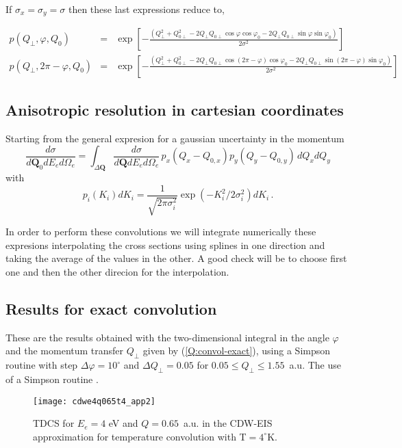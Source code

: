 If $\sigma_{x} = \sigma_{y}=\sigma $ then these last expressions reduce to,

\begin{eqnarray*}
p(Q_{\perp },\varphi ,Q_{0}) &=&\exp \left[ -\frac{(Q_{\perp }^{2}+Q_{0\perp}^{2}-2Q_{\perp} Q_{0\perp }\cos \varphi \cos \varphi _{0}-2Q_{\perp} Q_{0\perp }\sin \varphi \sin \varphi _{0})}{2\sigma ^{2}}\right]  \\
p(Q_{\perp },2\pi -\varphi ,Q_{0}) &=&\exp \left[ -\frac{(Q_{\perp}^{2}+Q_{0\perp }^{2}-2Q_{\perp }Q_{0\perp }\cos \left( 2\pi -\varphi \right) \cos \varphi _{0}-2Q_{\perp }Q_{0\perp }\sin \left( 2\pi -\varphi \right) \sin \varphi _{0})}{2\sigma ^{2}}\right] 
\end{eqnarray*}


\subsection{Anisotropic resolution in cartesian coordinates} 
\label{S:anis-resol-carte-coord}

Starting from the general expresion for a gaussian uncertainty in the momentum
\[
\frac{d \sigma}{d \bm{Q}_{0} d E_{e} d \Omega_{e}} = \int_{\Delta
  \bm{Q}} \frac{d \sigma}{d \bm{Q} d E_{e} d \Omega_{e}}\, p_{x}( Q_{x}- Q_{0,x} ) p_{y}( Q_{y}- Q_{0,y} ) \, d Q_{x} d Q_{y}
\]
with
\[
 p_{i}(K_{i}) dK_{i} = \frac{1}{\sqrt{2 \pi \sigma_{i}^2}} \exp (-K_{i}^{2} / 2\sigma_{i}^{2}) dK_{i} \, .  
\]

In order to perform these convolutions we will integrate numerically these expresions interpolating the cross sections using splines in one direction and taking the average of the values in the other. A good check will be to choose first one and then the other direcion for the interpolation.

\subsection{Results for exact convolution}
\label{S:resul-exact-convol}

These are the results obtained with the two-dimensional integral in the angle $\varphi$ and the momentum transfer $Q_{\perp}$ given by (\ref{Q:convol-exact}), using a Simpson routine with step $\Delta \varphi = 10^{\circ}$ and $\Delta Q_{\perp}=0.05$ for $0.05 \le Q_{\perp} \le 1.55$~a.u.  The use of a Simpson routine . 

\begin{figure}[!htpb]
  \centering
\texttt{[image: cdwe4q065t4\_app2]}
  \caption{TDCS for $E_{e}=4$ eV and $Q=0.65$~a.u. in the CDW-EIS approximation for temperature convolution with T$=4^{\circ}$K.}
  \label{F:cdwe4q065t4_app2}
\end{figure}

